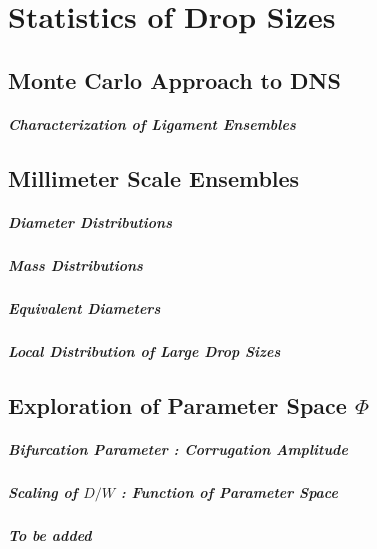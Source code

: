 \setchapterpreamble[u]{\margintoc}
\chapter{Statistics of Drop Sizes}


\section{Monte Carlo Approach to DNS}

\paragraph{Characterization of Ligament Ensembles}
\blindtext


\section{Millimeter Scale Ensembles}

\paragraph{Diameter Distributions}
\blindtext

\paragraph{Mass Distributions}
\blindtext

\paragraph{Equivalent Diameters}
\blindtext

\paragraph{Local Distribution of Large Drop Sizes}
\blindtext


\section{Exploration of Parameter Space $\Phi$ }

\paragraph{Bifurcation Parameter : Corrugation Amplitude}
\blindtext

\paragraph{Scaling of $D/W$ : Function of Parameter Space}
\blindtext

\paragraph{\textit{To be added}}
\blindtext


